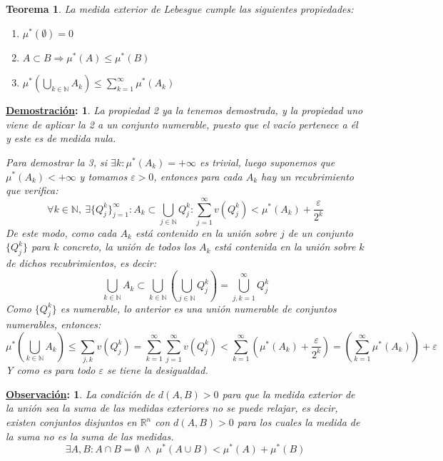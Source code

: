 \documentclass[10pt,a4paper,openright]{book}
\theoremstyle{break}
\newtheorem*{theo}{Teorema}
\newtheorem*{demo}{\underline{Demostración}:}
\newtheorem*{obs}{\underline{Observación}:}
\begin{document}
\begin{theo}
    La medida exterior de Lebesgue cumple las siguientes propiedades: 
    \begin{enumerate}
        \item $ \mu^*\left( \emptyset \right) = 0 $ 
        \item $A \subset B \Rightarrow \mu^*\left( A \right) \le \mu^*\left( B \right)$
        \item $ \mu^*\left( \bigcup_{k\in \mathbb{N}} A_k \right) \le \sum_{k=1}^{\infty} \mu^*\left( A_k \right)$
    \end{enumerate}
\end{theo}
 \begin{demo}
La propiedad 2 ya la tenemos demostrada, y la propiedad uno viene de aplicar la 2 a un conjunto numerable, puesto que el vacío pertenece a él y este es de medida nula. 

Para demostrar la 3, si $\exists k: \mu^*\left( A_k \right) = +\infty$ es trivial, luego suponemos que $ \mu^*\left( A_k \right) < +\infty$ y tomamos $ \varepsilon>0$, entonces para cada $A_k$ hay un recubrimiento que verifica:
$$ \forall k \in \mathbb N, \ \exists \{Q_j^k\}_{j=1}^\infty : A_k \subset \bigcup_{j \in \mathbb{N}} Q_j^{k} : \sum_{j=1}^{\infty} v\left( Q_j^k \right) < \mu^*\left( A_k \right) + \frac{\varepsilon}{2^k}
$$
De este modo, como cada $A_k$ está contenido en la unión sobre $j$ de un conjunto $\{Q_j^k\}$ para $k$ concreto, la unión de todos los $A_k$ está contenida en la unión sobre $k$ de dichos recubrimientos, es decir: 
$$\bigcup_{k \in \mathbb{N}} A_k \subset \bigcup_{k \in \mathbb{N}} \left(\bigcup_{j \in \mathbb{N}} Q_j^k  \right) = \bigcup_{j, k = 1} ^{\infty} Q_j^k$$
Como $\{Q_j^k\}$ es numerable, lo anterior es una unión numerable de conjuntos numerables,  entonces:
$$\mu^*\left( \bigcup_{k\in \mathbb{N}} A_k \right) \le \sum_{j, k} v\left( Q_j^k \right) = \sum_{k=1}^{\infty} \sum_{j=1}^{\infty} v\left( Q_j^k \right) < \sum_{k=1}^{\infty} \left( \mu^*\left( A_k \right) + \frac{\varepsilon}{2^k} \right) = \left( \sum_{k=1}^{\infty} \mu^*\left( A_k \right) \right) + \varepsilon $$
Y como es para todo $\varepsilon$ se tiene la desigualdad.
\end{demo}

\begin{obs}
La condición de $d(A,B) > 0$ para que la medida exterior de la unión sea la suma de las medidas exteriores no se puede relajar, es decir, existen conjuntos disjuntos en $\mathbb{R}^n $ con $d(A,B)>0$ para los cuales la medida de la suma no es la suma de las medidas.
$$\exists A, B: A\cap B = \emptyset\; \land \;\mu^*\left( A\cup B \right) < \mu^*\left( A \right) + \mu^*\left( B \right)$$
\end{obs}
\end{document}
